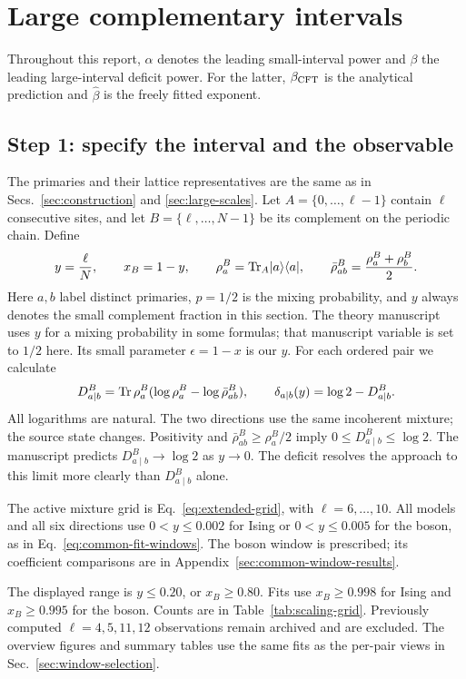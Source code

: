 \clearpage
\section{Large complementary intervals}
\label{sec:complement}

Throughout this report, $\alpha$ denotes the leading small-interval
power and $\beta$ the leading large-interval deficit power.
For the latter, $\beta_{\rm CFT}$ is the analytical prediction and
$\widehat\beta$ is the freely fitted exponent.

\subsection{Step 1: specify the interval and the observable}
The primaries and their lattice representatives are the same as in
Secs.~\ref{sec:construction} and \ref{sec:large-scales}.
Let $A=\{0,\ldots,\ell-1\}$ contain $\ell$ consecutive sites, and let
$B=\{\ell,\ldots,N-1\}$ be its complement on the periodic chain.
Define
\begin{equation}
 y=\frac{\ell}{N},\qquad x_B=1-y,\qquad
 \rho_a^B=\operatorname{Tr}_A\lvert a\rangle\langle a\rvert,\qquad
 \bar\rho_{ab}^B=\frac{\rho_a^B+\rho_b^B}{2}.
 \label{eq:complement-geometry}
\end{equation}
Here $a,b$ label distinct primaries, $p=1/2$ is the mixing probability,
and $y$ always denotes the small complement fraction in this section.
The theory manuscript uses $y$ for a mixing probability in some formulas;
that manuscript variable is set to $1/2$ here. Its small parameter
$\epsilon=1-x$ is our $y$.
For each ordered pair we calculate
\begin{equation}
 D^B_{a\mid b}=\operatorname{Tr}\rho_a^B(\log\rho_a^B-\log\bar\rho_{ab}^B),
 \qquad \delta_{a\mid b}(y)=\log2-D^B_{a\mid b}.
 \label{eq:complement-deficit}
\end{equation}
All logarithms are natural. The two directions use the same incoherent
mixture; the source state changes. Positivity and
$\bar\rho_{ab}^B\geq\rho_a^B/2$ imply $0\leq D^B_{a\mid b}\leq\log2$.
The manuscript predicts $D^B_{a\mid b}\to\log2$ as $y\to0$.
The deficit resolves the approach to this limit more clearly than
$D^B_{a\mid b}$ alone.

The active mixture grid is Eq.~\eqref{eq:extended-grid}, with
$\ell=6,\ldots,10$. All models and all six directions use
$0<y\leq0.002$ for Ising or $0<y\leq0.005$ for the boson,
as in Eq.~\eqref{eq:common-fit-windows}. The boson window is prescribed;
its coefficient comparisons are in Appendix~\ref{sec:common-window-results}.

The displayed range is $y\leq0.20$, or $x_B\geq0.80$.
Fits use $x_B\geq0.998$ for Ising and $x_B\geq0.995$ for the
boson. Counts are in Table~\ref{tab:scaling-grid}. Previously computed
$\ell=4,5,11,12$ observations remain archived and are excluded.
The overview figures and summary tables use the same fits as the
per-pair views in Sec.~\ref{sec:window-selection}.


